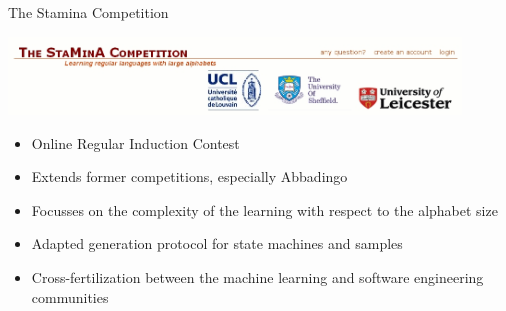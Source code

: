 \begin{frame}{The Stamina Competition}

  \begin{center}
    \includegraphics[width=12cm]{images/stamina.jpg}
  \end{center}

  \begin{itemize}
    \item Online Regular Induction Contest
    \item Extends former competitions, especially Abbadingo
    \item Focusses on the complexity of the learning with respect to the alphabet size
    \item Adapted generation protocol for state machines and samples
    \item Cross-fertilization between the machine learning and software engineering communities
  \end{itemize}

\end{frame}

